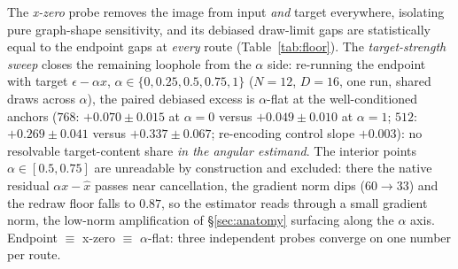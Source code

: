The \emph{x-zero} probe removes the image from input \emph{and} target
everywhere, isolating pure graph-shape sensitivity, and its debiased
draw-limit gaps are statistically equal to the endpoint gaps at
\emph{every} route (Table~\ref{tab:floor}). The
\emph{target-strength sweep} closes the remaining loophole from the
$\alpha$ side: re-running the endpoint with target $\epsilon - \alpha x$,
$\alpha \in \{0, 0.25, 0.5, 0.75, 1\}$ ($N{=}12$, $D{=}16$, one run,
shared draws across $\alpha$), the paired debiased excess is
$\alpha$-flat at the well-conditioned anchors ($768$:
$+0.070 \pm 0.015$ at $\alpha{=}0$ versus $+0.049 \pm 0.010$ at
$\alpha{=}1$; $512$: $+0.269 \pm 0.041$ versus $+0.337 \pm 0.067$;
re-encoding control slope $+0.003$): no resolvable target-content
share \emph{in the angular estimand}. The interior points $\alpha \in [0.5, 0.75]$ are unreadable by
construction and excluded: there the native residual
$\alpha x - \hat{x}$ passes near cancellation, the gradient norm dips
($60 \to 33$) and the redraw floor falls to $0.87$, so the estimator
reads through a small gradient norm, the low-norm amplification of
\S\ref{sec:anatomy} surfacing along the $\alpha$ axis. Endpoint $\equiv$
x-zero $\equiv$ $\alpha$-flat: three independent probes converge on one
number per route.

